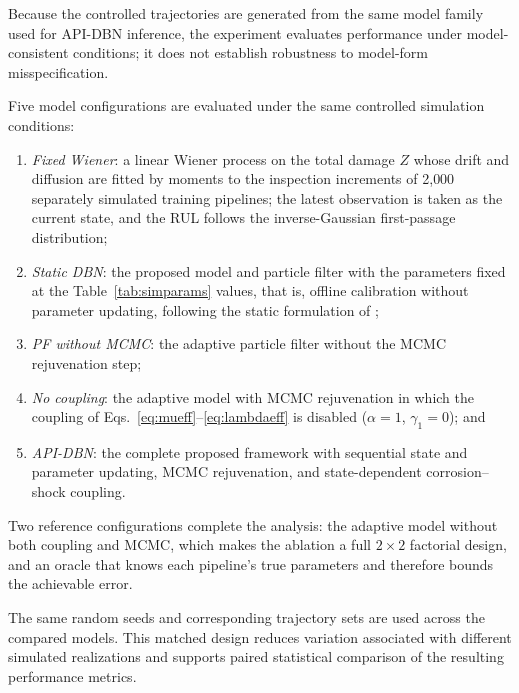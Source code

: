 \documentclass[journal]{IEEEtran}
\begin{document}
Because the controlled trajectories are generated from the same model
family used for API-DBN inference, the experiment evaluates performance
under model-consistent conditions; it does not establish robustness to
model-form misspecification.

Five model configurations are evaluated under the same controlled
simulation conditions:

\begin{enumerate}
    \item \textit{Fixed Wiener}: a linear Wiener process on the total
    damage $Z$ whose drift and diffusion are fitted by moments to the
    inspection increments of 2{,}000 separately simulated training
    pipelines; the latest observation is taken as the current state,
    and the RUL follows the inverse-Gaussian first-passage distribution;

    \item \textit{Static DBN}: the proposed model and particle filter
    with the parameters fixed at the Table~\ref{tab:simparams} values,
    that is, offline calibration without parameter updating, following
    the static formulation of \cite{liu2023};

    \item \textit{PF without MCMC}: the adaptive particle filter without
    the MCMC rejuvenation step;

    \item \textit{No coupling}: the adaptive model with MCMC
    rejuvenation in which the coupling of
    Eqs.~\eqref{eq:mueff}--\eqref{eq:lambdaeff} is disabled
    ($\alpha=1$, $\gamma_1=0$); and

    \item \textit{API-DBN}: the complete proposed framework with
    sequential state and parameter updating, MCMC rejuvenation, and
    state-dependent corrosion--shock coupling.
\end{enumerate}

Two reference configurations complete the analysis: the adaptive model
without both coupling and MCMC, which makes the ablation a full
$2\times2$ factorial design, and an oracle that knows each pipeline's
true parameters and therefore bounds the achievable error.

The same random seeds and corresponding trajectory sets are used across
the compared models. This matched design reduces variation associated
with different simulated realizations and supports paired statistical
comparison of the resulting performance metrics.
\end{document}
